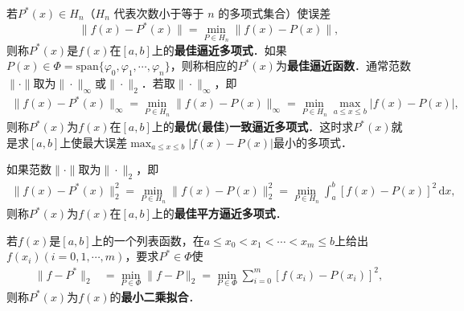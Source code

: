 \documentclass[../../main.tex]{subfiles}%
\begin{document}
\begin{definition}
若\( P^*(x) \in H_n \)（$H_n$ 代表次数小于等于 $n$ 的多项式集合）使误差
\[
\| f(x) - P^* (x) \| = \min_{P \in H_n} \| f(x) - P(x) \|,
\]
则称\( P^*(x) \)是\( f(x) \)在\([a,b]\)上的\textbf{最佳逼近多项式}．如果\( P(x) \in \Phi = \text{span}\{\varphi_0, \varphi_1, \cdots, \varphi_n\} \)，则称相应的\( P^*(x) \)为\textbf{最佳逼近函数}．通常范数\( \|\cdot\| \)取为\( \|\cdot\|_\infty \)或\( \|\cdot\|_2 \)．若取\( \|\cdot\|_\infty \)，即
\begin{align}
\| f(x) - P^* (x) \|_\infty = \min_{P \in H_n} \| f(x) - P(x) \|_\infty = \min_{P \in H_n} \max_{a \leqslant x \leqslant b} | f(x) - P(x) |, \label{eq:数值分析-3-1.18}
\end{align}
则称\( P^*(x) \)为\( f(x) \)在\([a,b]\)上的\textbf{最优(最佳)一致逼近多项式}．这时求\( P^*(x) \)就是求\([a,b]\)上使最大误差\( \max_{a \leqslant x \leqslant b} | f(x) - P(x) | \)最小的多项式．

如果范数\( \|\cdot\| \)取为\( \|\cdot\|_2 \)，即
\begin{align}
\| f(x) - P^* (x) \|_2^2 = \min_{P \in H_n} \| f(x) - P(x) \|_2^2 = \min_{P \in H_n} \int_a^b [f(x) - P(x)]^2 \, \mathrm{d}x, \label{eq:数值分析-3-1.19}
\end{align}
则称\( P^*(x) \)为\( f(x) \)在\([a,b]\)上的\textbf{最佳平方逼近多项式}．

若\( f(x) \)是\([a,b]\)上的一个列表函数，在\( a \leqslant x_0 < x_1 < \cdots < x_m \leqslant b \)上给出\( f(x_i)(i=0,1,\cdots,m) \)，要求\( P^* \in \Phi \)使
\begin{align}
\| f - P^* \|_2 &= \min_{P \in \Phi} \| f - P \|_2 = \min_{P \in \Phi} \sum_{i=0}^m [f(x_i) - P(x_i)]^2, \label{eq:数值分析-3-1.20}
\end{align}
则称\( P^*(x) \)为\( f(x) \)的\textbf{最小二乘拟合}．
\end{definition}
\end{document}
